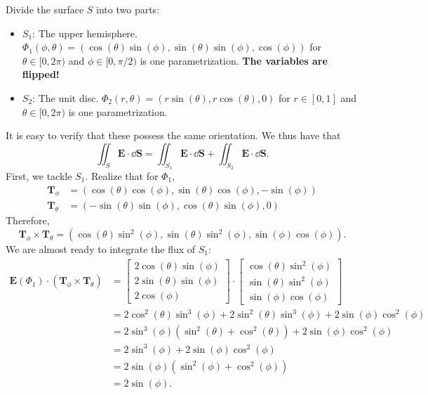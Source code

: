 \documentclass[11pt]{article}
\renewcommand{\vec}[1]{\mathbf{#1}}
\begin{document}
Divide the surface $S$ into two parts:
\begin{itemize}
	\item $S_{1}$: The upper hemisphere. $\Phi_{1}(\phi, \theta) = (\cos(\theta)\sin(\phi), \sin(\theta)\sin(\phi), \cos(\phi))$ for $\theta \in [0, 2\pi)$ and $\phi \in [0, \pi/2)$ is one parametrization. \textbf{The variables are flipped!}
	\item $S_{2}$: The unit disc. $\Phi_{2}(r, \theta) = (r \sin(\theta), r\cos(\theta), 0)$ for $r \in [0, 1]$ and $\theta \in [0, 2\pi)$ is one parametrization.
\end{itemize}
It is easy to verify that these possess the same orientation. We thus have that
\begin{equation}
	\iint_{S} \mathbf{E} \cdot \dd{\vec{S}} = \iint_{S_{1}} \mathbf{E} \cdot \dd{\vec{S}} + \iint_{S_{2}} \mathbf{E} \cdot \dd{\vec{S}}.
\end{equation}
First, we tackle $S_{1}$. Realize that for $\Phi_{1}$,
\begin{align*}
	\mathbf{T}_{\phi} &= (\cos(\theta)\cos(\phi), \sin(\theta)\cos(\phi), -\sin(\phi)) \\
	\mathbf{T}_{\theta} &= (-\sin(\theta)\sin(\phi), \cos(\theta)\sin(\phi), 0)
\end{align*}
Therefore,
\[
	\mathbf{T}_{\phi} \times \mathbf{T}_{\theta} = (\cos(\theta)\sin^{2}(\phi), \sin(\theta)\sin^{2}(\phi), \sin(\phi)\cos(\phi)).
\]
We are almost ready to integrate the flux of $S_{1}$:
\begin{align*}
	\mathbf{E}(\Phi_{1}) \cdot (\mathbf{T}_{\phi} \times \mathbf{T}_{\theta}) &= \begin{bmatrix} 2\cos(\theta)\sin(\phi) \\ 2\sin(\theta)\sin(\phi) \\ 2\cos(\phi) \end{bmatrix} \cdot \begin{bmatrix} \cos(\theta)\sin^{2}(\phi) \\ \sin(\theta)\sin^{2}(\phi) \\ \sin(\phi)\cos(\phi) \end{bmatrix} \\
	&= 2\cos^{2}(\theta)\sin^{3}(\phi) + 2\sin^{2}(\theta)\sin^{3}(\phi) + 2\sin(\phi)\cos^{2}(\phi) \\
	&= 2 \sin^{3}(\phi)(\sin^{2}(\theta) + \cos^{2}(\theta)) + 2 \sin(\phi)\cos^{2}(\phi) \\
	&= 2\sin^{3}(\phi) + 2\sin(\phi)\cos^{2}(\phi) \\
	&= 2\sin(\phi)(\sin^{2}(\phi) + \cos^{2}(\phi)) \\
	&= 2\sin(\phi).
\end{align*}
\end{document}

